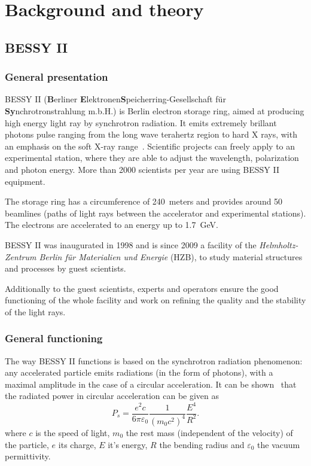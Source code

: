 
\chapter{Background and theory}
\label{sec:background}

\section{BESSY II}

\subsection{General presentation}
BESSY II (\textbf{B}erliner \textbf{E}lektronen\-\textbf{S}peicherring-Gesellschaft für \textbf{Sy}n\-chro\-tron\-strahlung m.b.H.) is Berlin electron storage ring, aimed at producing high energy light ray by synchrotron radiation. It emits extremely brillant photons pulse ranging from the long wave terahertz region to hard X rays, with an emphasis on the soft X-ray range~\cite{web:bessy_homepage}. Scientific projects can freely apply to an experimental station, where they are able to adjust the wavelength, polarization and photon energy. More than 2000 scientists per year are using BESSY II equipment.

The storage ring has a circumference of 240~meters and provides around 50 beamlines (paths of light rays between the accelerator and experimental stations). The electrons are accelerated to an energy up to 1.7~GeV.

BESSY II was inaugurated in 1998 and is since 2009 a facility of the \textit{Helmholtz-Zentrum Berlin für Materialien und Energie} (HZB), to study material structures and processes by guest scientists.

Additionally to the guest scientists, experts and operators ensure the good functioning of the whole facility and work on refining the quality and the stability of the light rays. 

\subsection{General functioning}
The way BESSY II functions is based on the synchrotron radiation phenomenon: any accelerated particle emits radiations (in the form of photons), with a maximal amplitude in the case of a circular acceleration.  It can be shown~\cite{book:wille} that the radiated power in circular acceleration can be given as 
\begin{equation}
P_s = \frac{e^2 c}{6 \pi \varepsilon_0}\frac{1}{(m_0 c^2)^4}\frac{E^4}{R^2}.
\end{equation}
where $c$ is the speed of light, $m_0$ the rest mass (independent of the velocity) of the particle, $e$ its charge, $E$ it's energy, $R$ the bending radius and $\varepsilon_0$ the  vacuum permittivity.

